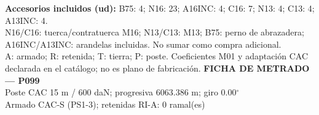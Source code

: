 \begingroup\scriptsize
\textbf{Accesorios incluidos (ud):} B75: 4; N16: 23; A16INC: 4; C16: 7; N13: 4; C13: 4; A13INC: 4.\\
N16/C16: tuerca/contratuerca M16; N13/C13: M13; B75: perno de abrazadera; A16INC/A13INC: arandelas incluidas. No sumar como compra adicional.\\
A: armado; R: retenida; T: tierra; P: poste. Coeficientes M01 y adaptación CAC declarada en el catálogo; no es plano de fabricación.
\endgroup\endgroup
\clearpage{}
\begingroup\small\setlength{\parskip}{3pt}\renewcommand{\arraystretch}{1.05}
\textbf{\large FICHA DE METRADO — P099}\\[4pt]
Poste CAC 15 m / 600 daN; progresiva 6063.386 m; giro 0.00\ensuremath{^\circ}\\
Armado CAC-S (PS1-3); retenidas RI-A: 0 ramal(es)\\
\begingroup\scriptsize
